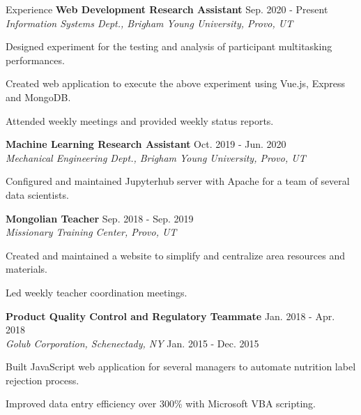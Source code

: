 \documentclass{resume} %
\begin{document}
\begin{rSection}{Experience}
    \textbf{Web Development Research Assistant}\hfill{ Sep.  2020 -
    Present}\\
    \textit{Information Systems Dept., Brigham Young University, Provo, UT} 
    \begin{compactitem}
        \item Designed experiment for the testing and analysis of participant multitasking
            performances.
        \item Created web application to execute the above experiment using Vue.js, Express
            and MongoDB.
        \item Attended weekly meetings and provided weekly status reports.
    \end{compactitem}
\textbf{Machine Learning Research Assistant} \hfill{Oct. 2019
- Jun. 2020}\\
\textit{Mechanical Engineering Dept., Brigham Young University, Provo, UT}
    \begin{compactitem}
        \item Configured and maintained Jupyterhub server with Apache for a team of
            several data scientists.
    \end{compactitem}
\textbf{Mongolian Teacher} \hfill {Sep. 2018 - Sep. 2019}\\
\textit{Missionary Training Center, Provo, UT} 
    \begin{compactitem}
        \item Created and maintained a website to simplify and centralize area resources and
            materials.
        \item Led weekly teacher coordination meetings.
    \end{compactitem}
\textbf{Product Quality Control and Regulatory Teammate}    \hfill {Jan. 2018 -
Apr. 2018}\\
\textit{Golub Corporation, Schenectady, NY}                 \hfill {Jan. 2015 -
Dec. 2015}  
    \begin{compactitem}
        \item Built JavaScript web application for several managers to automate nutrition label
            rejection process.
        \item Improved data entry efficiency over 300\% with Microsoft VBA scripting.
    \end{compactitem}
\end{rSection}
\end{document}
